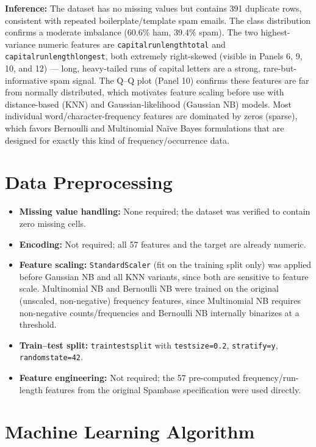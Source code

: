 \documentclass[12pt,a4paper]{article}
\DeclareRobustCommand{\_}{\textunderscore\allowbreak}
\begin{document}
\textbf{Inference:} The dataset has no missing values but contains 391
duplicate rows, consistent with repeated boilerplate/template spam emails.
The class distribution confirms a moderate imbalance (60.6\% ham, 39.4\%
spam). The two highest-variance numeric features are
\texttt{capital\_run\_length\_total} and \texttt{capital\_run\_length\_longest},
both extremely right-skewed (visible in Panels 6, 9, 10, and 12) --- long,
heavy-tailed runs of capital letters are a strong, rare-but-informative spam
signal. The Q--Q plot (Panel 10) confirms these features are far from
normally distributed, which motivates feature scaling before use with
distance-based (KNN) and Gaussian-likelihood (Gaussian NB) models. Most
individual word/character-frequency features are dominated by zeros (sparse),
which favors Bernoulli and Multinomial Na\"ive Bayes formulations that are
designed for exactly this kind of frequency/occurrence data.

\section{Data Preprocessing}

\begin{itemize}
\item \textbf{Missing value handling:} None required; the dataset was
verified to contain zero missing cells.
\item \textbf{Encoding:} Not required; all 57 features and the target are
already numeric.
\item \textbf{Feature scaling:} \texttt{StandardScaler} (fit on the training
split only) was applied before Gaussian NB and all KNN variants, since both
are sensitive to feature scale. Multinomial NB and Bernoulli NB were trained
on the original (unscaled, non-negative) frequency features, since
Multinomial NB requires non-negative counts/frequencies and Bernoulli NB
internally binarizes at a threshold.
\item \textbf{Train--test split:} \texttt{train\_test\_split} with
\texttt{test\_size=0.2}, \texttt{stratify=y}, \texttt{random\_state=42}.
\item \textbf{Feature engineering:} Not required; the 57 pre-computed
frequency/run-length features from the original Spambase specification were
used directly.
\end{itemize}

\section{Machine Learning Algorithm}
\end{document}
